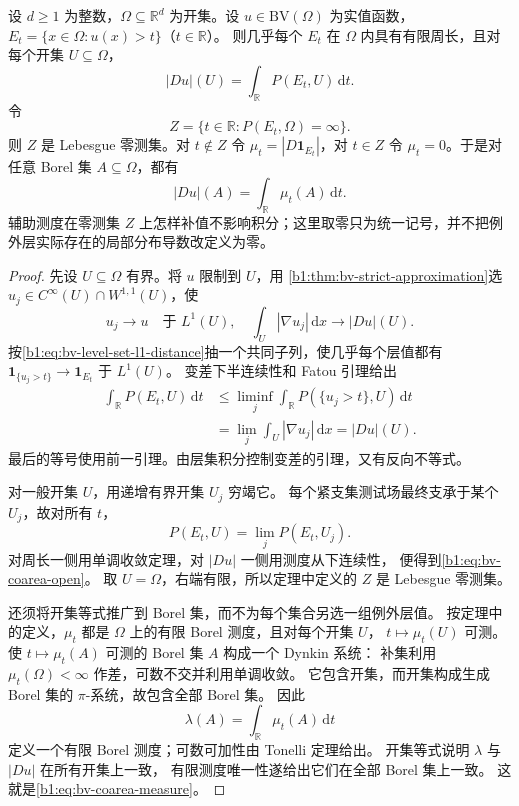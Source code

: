 \begin{theorem}[有界变差函数的余面积公式]\label{b1:thm:bv-coarea}
设 \(d\ge1\) 为整数，\(\Omega\subseteq\mathbb R^d\) 为开集。设 \(u\in \mathrm{BV}(\Omega)\) 为实值函数，\(E_t=\{x\in\Omega:u(x)>t\}\)（\(t\in\mathbb R\)）。
则几乎每个 \(E_t\) 在 \(\Omega\) 内具有有限周长，且对每个开集 \(U\subseteq\Omega\)，
\begin{equation}\label{b1:eq:bv-coarea-open}
 |Du|(U)=\int_{\mathbb R}P(E_t,U)\,\mathrm dt.
\end{equation}
令
\[
 Z=\{t\in\mathbb R:P(E_t,\Omega)=\infty\}.
\]
则 \(Z\) 是 Lebesgue 零测集。对 \(t\notin Z\) 令
\(\mu_t=|D\mathbf1_{E_t}|\)，对 \(t\in Z\) 令 \(\mu_t=0\)。于是对任意 Borel 集
\(A\subseteq\Omega\)，都有
\begin{equation}\label{b1:eq:bv-coarea-measure}
 |Du|(A)=\int_{\mathbb R}\mu_t(A)\,\mathrm dt.
\end{equation}
辅助测度在零测集 \(Z\) 上怎样补值不影响积分；这里取零只为统一记号，并不把例外层实际存在的局部分布导数改定义为零。
\end{theorem}
\begin{proof}
先设 \(U\subseteq\Omega\) 有界。将 \(u\) 限制到 \(U\)，用%
\cref{b1:thm:bv-strict-approximation}选
\(u_j\in C^\infty(U)\cap W^{1,1}(U)\)，使
\[
 u_j\to u\quad\text{于 }L^1(U),\quad
 \int_U|\nabla u_j|\,\mathrm dx\longrightarrow|Du|(U).
\]
按\eqref{b1:eq:bv-level-set-l1-distance}抽一个共同子列，使几乎每个层值都有
\(\mathbf1_{\{u_j>t\}}\to\mathbf1_{E_t}\) 于 \(L^1(U)\)。
变差下半连续性和 Fatou 引理给出
\[
 \begin{aligned}
 \int_{\mathbb R}P(E_t,U)\,\mathrm dt
 &\le\liminf_j\int_{\mathbb R}P(\{u_j>t\},U)\,\mathrm dt\\
 &=\lim_j\int_U|\nabla u_j|\,\mathrm dx=|Du|(U).
 \end{aligned}
\]
最后的等号使用前一引理。由层集积分控制变差的引理，又有反向不等式。

对一般开集 \(U\)，用递增有界开集 \(U_j\) 穷竭它。
每个紧支集测试场最终支承于某个 \(U_j\)，故对所有 \(t\)，
\[
 P(E_t,U)=\lim_jP(E_t,U_j).
\]
对周长一侧用单调收敛定理，对 \(|Du|\) 一侧用测度从下连续性，
便得到\eqref{b1:eq:bv-coarea-open}。
取 \(U=\Omega\)，右端有限，所以定理中定义的 \(Z\) 是 Lebesgue 零测集。

还须将开集等式推广到 Borel 集，而不为每个集合另选一组例外层值。
按定理中的定义，\(\mu_t\) 都是 \(\Omega\) 上的有限 Borel 测度，且对每个开集 \(U\)，
\(t\mapsto\mu_t(U)\) 可测。
使 \(t\mapsto\mu_t(A)\) 可测的 Borel 集 \(A\) 构成一个 Dynkin 系统：
补集利用 \(\mu_t(\Omega)<\infty\) 作差，可数不交并利用单调收敛。
它包含开集，而开集构成生成 Borel 集的 \(\pi\)-系统，故包含全部 Borel 集。
因此
\[
 \lambda(A)=\int_{\mathbb R}\mu_t(A)\,\mathrm dt
\]
定义一个有限 Borel 测度；可数可加性由 Tonelli 定理给出。
开集等式说明 \(\lambda\) 与 \(|Du|\) 在所有开集上一致，
有限测度唯一性遂给出它们在全部 Borel 集上一致。
这就是\eqref{b1:eq:bv-coarea-measure}。
\end{proof}


